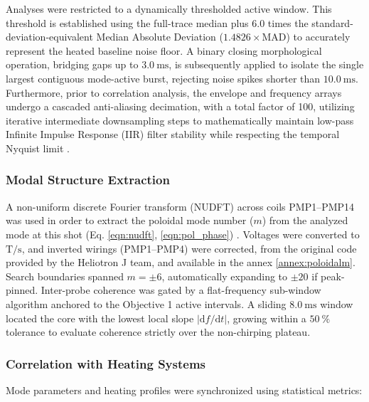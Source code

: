 Analyses were restricted to a dynamically thresholded active window. This threshold is established using the full-trace median plus $6.0$ times the standard-deviation-equivalent Median Absolute Deviation ($1.4826 \times \mathrm{MAD}$) to accurately represent the heated baseline noise floor. A binary closing morphological operation, bridging gaps up to $3.0~\mathrm{ms}$, is subsequently applied to isolate the single largest contiguous mode-active burst, rejecting noise spikes shorter than $10.0~\mathrm{ms}$. Furthermore, prior to correlation analysis, the envelope and frequency arrays undergo a cascaded anti-aliasing decimation, with a total factor of 100, utilizing iterative intermediate downsampling steps to mathematically maintain low-pass Infinite Impulse Response (IIR) filter stability while respecting the temporal Nyquist limit \cite{boashash2015time, Fabus2021}.

\subsubsection{Modal Structure Extraction}
A non-uniform discrete Fourier transform (NUDFT) across coils PMP1--PMP14 was used in order to extract the poloidal mode number ($m$) from the analyzed mode at this shot (Eq. \ref{eqn:nudft}, \ref{eqn:pol_phase}) \cite{Varela2019}. Voltages were converted to $\mathrm{T}/\mathrm{s}$, and inverted wirings (PMP1--PMP4) were corrected, from the original code provided by the Heliotron J team, and available in the annex \ref{annex:poloidalm}. Search boundaries spanned $m = \pm 6$, automatically expanding to $\pm 20$ if peak-pinned.
Inter-probe coherence was gated by a flat-frequency sub-window algorithm anchored to the Objective 1 active intervals. A sliding $8.0~\mathrm{ms}$ window located the core with the lowest local slope $|\mathrm{d}f/\mathrm{d}t|$, growing within a $50~\%$ tolerance to evaluate coherence strictly over the non-chirping plateau.

\subsubsection{Correlation with Heating Systems}
Mode parameters and heating profiles were synchronized using statistical metrics:

